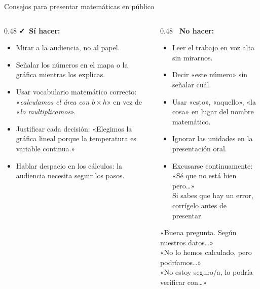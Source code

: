 \documentclass[aspectratio=169, 10pt, spanish]{beamer}
\begin{document}
\begin{frame}{Consejos para presentar matemáticas en público}
  \begin{columns}[T]
    \begin{column}{0.48\textwidth}
      \textbf{\color{AlmVerde}\faCheck\ Sí hacer:}
      \begin{itemize}
        \item Mirar a la audiencia, no al papel.
        \item Señalar los números en el mapa o la gráfica
              mientras los explicas.
        \item Usar vocabulario matemático correcto:
              «\textit{calculamos el área con $b \times h$}»
              en vez de «\textit{lo multiplicamos}».
        \item Justificar cada decisión:
              «Elegimos la gráfica lineal porque
              la temperatura es variable continua.»
        \item Hablar despacio en los cálculos:
              la audiencia necesita seguir los pasos.
      \end{itemize}
    \end{column}
    \begin{column}{0.48\textwidth}
      \textbf{\color{AlmTerra}\faTimes\ No hacer:}
      \begin{itemize}
        \item Leer el trabajo en voz alta sin mirarnos.
        \item Decir «este número» sin señalar cuál.
        \item Usar «esto», «aquello», «la cosa»
              en lugar del nombre matemático.
        \item Ignorar las unidades en la presentación oral.
        \item Excusarse continuamente: «Sé que no está bien pero\ldots»\\
              {\AlmFontFootnote Si sabes que hay un error,
              corrígelo antes de presentar.}
      \end{itemize}
      \vspace{6pt}
      \begin{notabox}
        \AlmFontFootnote
        «Buena pregunta. Según nuestros datos\ldots»\\
        «No lo hemos calculado, pero podríamos\ldots»\\
        «No estoy seguro/a, lo podría verificar con\ldots»
      \end{notabox}
    \end{column}
  \end{columns}
\end{frame}
\end{document}
